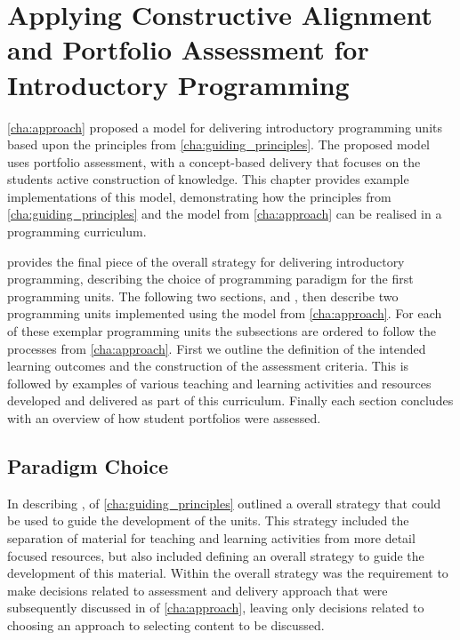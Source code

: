 
\chapter{Applying Constructive Alignment and Portfolio Assessment for Introductory Programming} %
\label{cha:example_impl}

\graphicspath{{Figures/CAIntroProg/}}

\cref{cha:approach} proposed a model for delivering introductory programming units based upon the principles from \cref{cha:guiding_principles}. The proposed model uses portfolio assessment, with a concept-based delivery that focuses on the students active construction of knowledge. This chapter provides example implementations of this model, demonstrating how the principles from \cref{cha:guiding_principles} and the model from \cref{cha:approach} can be realised in a programming curriculum.

 provides the final piece of the overall strategy for delivering introductory programming, describing the choice of programming paradigm for the first programming units. The following two sections,  and , then describe two programming units implemented using the model from \cref{cha:approach}. For each of these exemplar programming units the subsections are ordered to follow the processes from \cref{cha:approach}. First we outline the definition of the intended learning outcomes and the construction of the assessment criteria. This is followed by examples of various teaching and learning activities and resources developed and delivered as part of this curriculum. Finally each section concludes with an overview of how student portfolios were assessed.

\clearpage
\section{Paradigm Choice} %
\label{sec:paradigm_choice}

In describing ,  of \cref{cha:guiding_principles} outlined a overall strategy that could be used to guide the development of the units. This strategy included the separation of material for teaching and learning activities from more detail focused resources, but also included defining an overall strategy to guide the development of this material. Within the overall strategy was the requirement to make decisions related to assessment and delivery approach that were subsequently discussed in  of \cref{cha:approach}, leaving only decisions related to choosing an approach to selecting content to be discussed.

